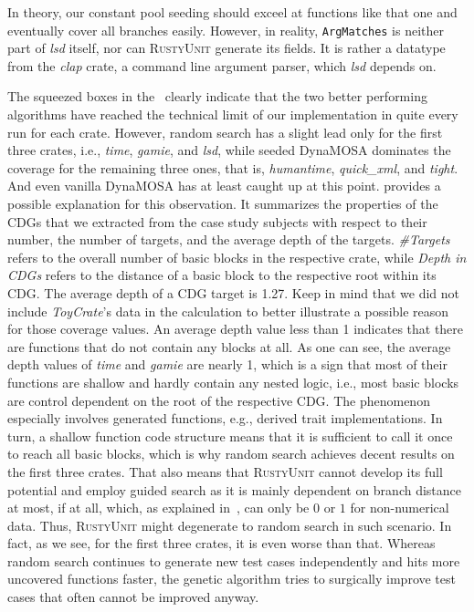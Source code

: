 \documentclass[paper=a4,%
  twoside,%
  BCOR4mm,%
  abstract=true,%
  toc=bibliography,%
  chapterprefix=true,%
  toc=bibliographynumbered,%
  open=right,%
  english,%
  pagesize=pdftex]{scrreprt}
\newcommand{\tech}{\textsc{RustyUnit}\xspace}
\newcommand{\cdg}{\ac{CDG}\xspace}
\newcommand{\cdgs}{\acp{CDG}\xspace}
\newcommand{\toycrate}{\emph{ToyCrate}\xspace}
\begin{document}
In theory, our constant pool seeding should exceel at functions like that one and eventually cover all branches easily. However, in reality, \texttt{ArgMatches} is neither part of \emph{lsd} itself, nor can \tech generate its fields. It is rather a datatype from the \emph{clap} crate, a command line argument parser, which \emph{lsd} depends on.

The squeezed boxes in the~ clearly indicate that the two better performing algorithms have reached the technical limit of our implementation in quite every run for each crate. However, random search has a slight lead only for the first three crates, i.e., \emph{time}, \emph{gamie}, and \emph{lsd}, while seeded DynaMOSA dominates the coverage for the remaining three ones, that is, \emph{humantime}, \emph{quick\_xml}, and \emph{tight}. And even vanilla DynaMOSA has at least caught up at this point.  provides a possible explanation for this observation. It summarizes the properties of the \cdgs that we extracted from the case study subjects with respect to their number, the number of targets, and the average depth of the targets. \emph{\#Targets} refers to the overall number of basic blocks in the respective crate, while \emph{Depth in \cdgs} refers to the distance of a basic block to the respective root within its \cdg. The average depth of a \cdg target is 1.27. Keep in mind that we did not include \toycrate's data in the calculation to better illustrate a possible reason for those coverage values. An average depth value less than 1 indicates that there are functions that do not contain any blocks at all. As one can see, the average depth values of \emph{time} and \emph{gamie} are nearly 1, which is a sign that most of their functions are shallow and hardly contain any nested logic, i.e., most basic blocks are control dependent on the root of the respective \cdg. The phenomenon especially involves generated functions, e.g., derived trait implementations. In turn, a shallow function code structure means that it is sufficient to call it once to reach all basic blocks, which is why random search achieves decent results on the first three crates. That also means that \tech cannot develop its full potential and employ guided search as it is mainly dependent on branch distance at most, if at all, which, as explained in~, can only be $0$ or $1$ for non-numerical data. Thus, \tech might degenerate to random search in such scenario. In fact, as we see, for the first three crates, it is even worse than that. Whereas random search continues to generate new test cases independently and hits more uncovered functions faster, the genetic algorithm tries to surgically improve test cases that often cannot be improved anyway.
\end{document}

